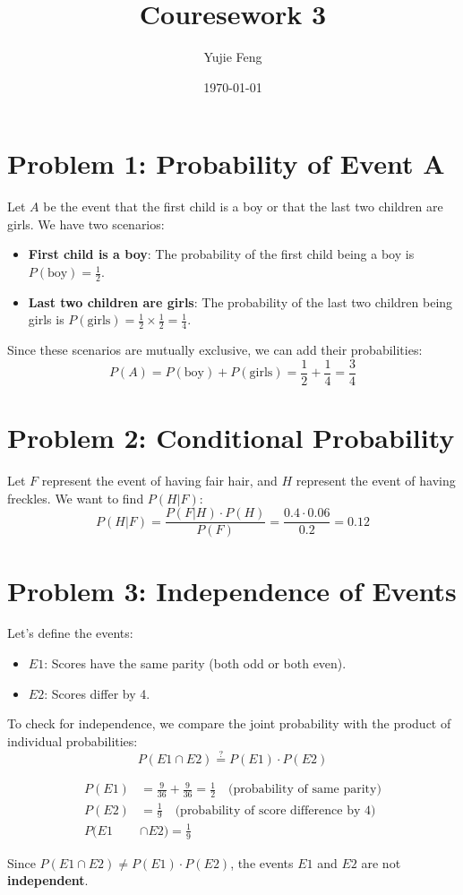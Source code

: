 \documentclass{article}
\begin{document}
\title{Couresework 3}
\author{Yujie Feng}
\date{\today}
\maketitle

\section*{Problem 1: Probability of Event A}

Let \(A\) be the event that the first child is a boy or that the last two children are girls. We have two scenarios:

\begin{itemize}
    \item \textbf{First child is a boy}:
    The probability of the first child being a boy is \(P(\text{boy}) = \frac{1}{2}\).

    \item \textbf{Last two children are girls}:
    The probability of the last two children being girls is \(P(\text{girls}) = \frac{1}{2} \times \frac{1}{2} = \frac{1}{4}\).
\end{itemize}

Since these scenarios are mutually exclusive, we can add their probabilities:
\[ P(A) = P(\text{boy}) + P(\text{girls}) = \frac{1}{2} + \frac{1}{4} = \frac{3}{4} \]

\section*{Problem 2: Conditional Probability}

Let \(F\) represent the event of having fair hair, and \(H\) represent the event of having freckles. We want to find \(P(H|F)\):
\[ P(H|F) = \frac{P(F|H) \cdot P(H)}{P(F)} = \frac{0.4 \cdot 0.06}{0.2} = 0.12 \]

\section*{Problem 3: Independence of Events}

Let's define the events:
\begin{itemize}
    \item \(E1\): Scores have the same parity (both odd or both even).
    \item \(E2\): Scores differ by 4.
\end{itemize}

To check for independence, we compare the joint probability with the product of individual probabilities:
\[ P(E1 \cap E2) \stackrel{?}{=} P(E1) \cdot P(E2) \]

\begin{align*}
    P(E1) &= \frac{9}{36} + \frac{9}{36} = \frac{1}{2}\quad \text{(probability of same parity)} \\
    P(E2) &= \frac{1}{9} \quad \text{(probability of score difference by 4)} \\
    P(E1 & \cap E2) = \frac{1}{9}
\end{align*}

Since \(P(E1 \cap E2) \neq P(E1) \cdot P(E2)\), the events \(E1\) and \(E2\) are not \textbf{independent}.
\end{document}
